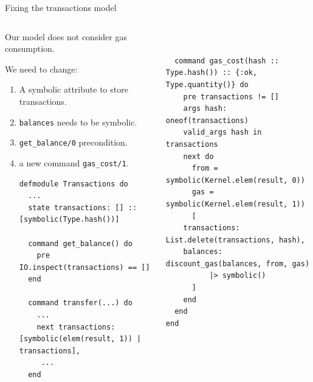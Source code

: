 \documentclass[aspectratio=169, 10pt]{beamer}
\begin{document}
\begin{frame}[label={sec:org0630d18},fragile]{Fixing the transactions model}
 \begin{columns}
\begin{column}{0.48\columnwidth}
Our model does not consider gas consumption.

\vspace{10pt}

We need to change:
\begin{enumerate}
\item A symbolic attribute to store transactions.
\item \texttt{balances} needs to be symbolic.
\item \texttt{get\_balance/0} precondition.
\item a new command \texttt{gas\_cost/1}.

\lstset{language=elixir,label= ,caption= ,captionpos=b,numbers=none,style=display}
\begin{lstlisting}
defmodule Transactions do
  ...   
  state transactions: [] :: [symbolic(Type.hash())]

  command get_balance() do
    pre IO.inspect(transactions) == []
  end

  command transfer(...) do
    ...
    next transactions: [symbolic(elem(result, 1)) | transactions],
	 ...   
  end
\end{lstlisting}
\end{enumerate}
\end{column}

\begin{column}{0.48\columnwidth}
\lstset{language=elixir,label= ,caption= ,captionpos=b,numbers=none,style=display}
\begin{lstlisting}


  command gas_cost(hash :: Type.hash()) :: {:ok, Type.quantity()} do
    pre transactions != []
    args hash: oneof(transactions)
    valid_args hash in transactions
    next do
      from = symbolic(Kernel.elem(result, 0))
      gas = symbolic(Kernel.elem(result, 1))
      [
	transactions: List.delete(transactions, hash),
	balances: discount_gas(balances, from, gas)
		  |> symbolic()
      ]
    end
  end
end



\end{lstlisting}
\end{column}
\end{columns}
\end{frame}
\end{document}
